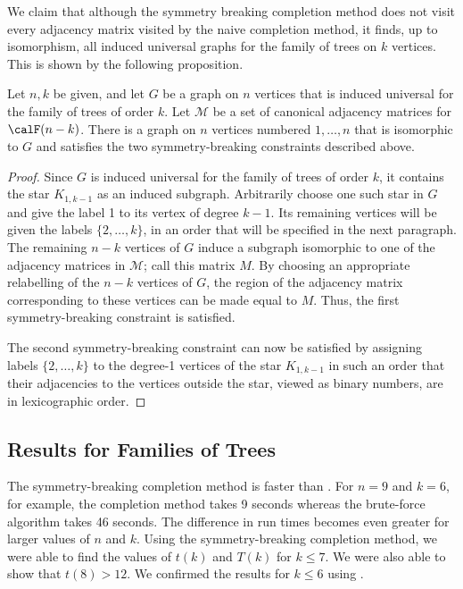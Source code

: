 We claim that although the symmetry breaking completion method does not
visit every adjacency matrix visited by the naive completion method,
it finds, up to isomorphism, all induced universal graphs for the family
of trees on $k$ vertices.  This is shown by the following proposition.

\begin{proposition}
    Let $n, k$ be given, and let $G$ be a graph on $n$ vertices that is
    induced universal for the family of trees of order $k$.  Let $\mathcal{M}$
    be a set of canonical adjacency matrices for $\calF(n-k)$.  There is
    a graph on $n$ vertices numbered $1, \dots, n$ that is isomorphic
    to $G$ and satisfies the two symmetry-breaking constraints described
    above.
\end{proposition}
\begin{proof}
    Since $G$ is induced universal for the family of trees of order $k$, it
    contains the star $K_{1,k-1}$ as an induced subgraph.  Arbitrarily
    choose one such star in $G$ and give the label 1 to its vertex of degree
    $k-1$.  Its remaining vertices will be given the labels $\{2, \dots, k\}$,
    in an order that will be specified in the next paragraph.
    The remaining $n-k$ vertices of $G$ induce a subgraph isomorphic
    to one of the adjacency matrices in $\mathcal{M}$; call this matrix $M$.
    By choosing an appropriate relabelling of the $n-k$ vertices of $G$,
    the region of the adjacency matrix corresponding to these vertices
    can be made equal to $M$.  Thus, the first symmetry-breaking constraint
    is satisfied.

    The second symmetry-breaking constraint can now be satisfied by assigning
    labels $\{2, \dots, k\}$ to the degree-1 vertices of the star $K_{1,k-1}$
    in such an order that their adjacencies to the vertices outside the star,
    viewed as binary numbers, are in lexicographic order.
\end{proof}

\subsection{Results for Families of Trees}

The symmetry-breaking completion method is faster than .
For $n=9$ and $k=6$, for example, the completion method takes 9 seconds whereas
the brute-force algorithm takes 46 seconds. The difference in run times becomes
even greater for larger values of $n$ and $k$.
Using the symmetry-breaking completion method,
we were able to find the values of $t(k)$ and $T(k)$ for $k \leq 7$. We were also
able to show that $t(8) > 12$.  We confirmed
the results for $k \leq 6$ using .

